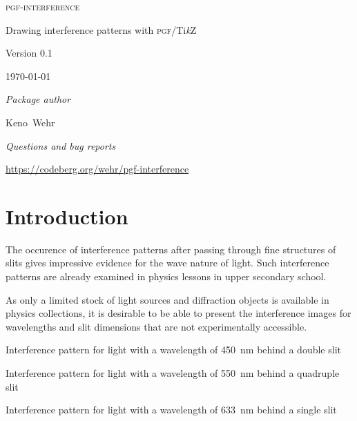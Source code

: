 \documentclass{scrartcl}
\newcommand*\Paket[1]{\textsf{#1}}
\newcommand\inter{\textcolor{pgfinterferencered}{\Paket{pgf-interference}}}
\newcommand\pgftikz{\Paket{\textsc{pgf}/Ti\textit{k}Z}}
\newcommand\AutorNachname{Wehr}
\newcommand\AutorVorname{Keno}
\begin{document}
\begin{center}
\fontsize{41}{41}\selectfont\textsc{\inter}

\medskip
\pgfinterferencepattern{}

\LARGE
\rmfamily
Drawing interference patterns with \pgftikz

\bigskip
\Large
\textcolor{pgfinterferencered}{Version 0.1}

\medskip
\large
\today

\bigskip
\textit{Package author}

\smallskip
\AutorVorname\ \AutorNachname

\bigskip
\textit{Questions and bug reports}

\smallskip
\normalsize
\url{https://codeberg.org/wehr/pgf-interference}
\end{center}

\begin{abstract}
\noindent This \LaTeX\ package makes it possible to simulate interference patterns occuring on a screen if monochromatic light is diffracted at regular structures of slits. It makes use of the \pgftikz\ graphics package.

\medskip
\noindent The package is still in an experimental stage. The user interface may change in future versions.

\medskip
\noindent
{} A German version of this manual is available in the file \texttt{pgf-interference-de.pdf}.
\end{abstract}

\vfill
\tableofcontents

\newpage
\section{Introduction}
The occurence of interference patterns after passing through fine structures of slits gives impressive evidence for the wave nature of light. Such interference patterns are already examined in physics lessons in upper secondary school.

As only a limited stock of light sources and diffraction objects is available in physics collections, it is desirable to be able to present the interference images for wavelengths and slit dimensions that are not experimentally accessible.
\begin{center}

\small
Interference pattern for light with a wavelength of
\qty{450}{nm}
behind a double slit

\medskip
{}

\small
Interference pattern for light with a wavelength of
\qty{550}{nm}
behind a quadruple slit

\medskip
{}

\small
Interference pattern for light with a wavelength of
\qty{633}{nm}
behind a single slit
\end{center}
\end{document}
